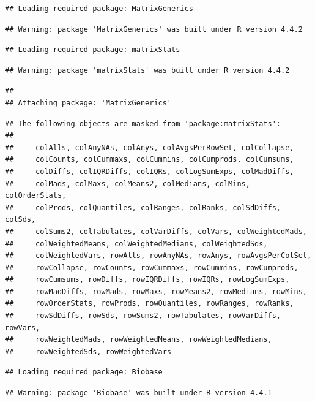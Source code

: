 \documentclass[
]{article}
\begin{document}
\begin{verbatim}
## Loading required package: MatrixGenerics
\end{verbatim}

\begin{verbatim}
## Warning: package 'MatrixGenerics' was built under R version 4.4.2
\end{verbatim}

\begin{verbatim}
## Loading required package: matrixStats
\end{verbatim}

\begin{verbatim}
## Warning: package 'matrixStats' was built under R version 4.4.2
\end{verbatim}

\begin{verbatim}
## 
## Attaching package: 'MatrixGenerics'
\end{verbatim}

\begin{verbatim}
## The following objects are masked from 'package:matrixStats':
## 
##     colAlls, colAnyNAs, colAnys, colAvgsPerRowSet, colCollapse,
##     colCounts, colCummaxs, colCummins, colCumprods, colCumsums,
##     colDiffs, colIQRDiffs, colIQRs, colLogSumExps, colMadDiffs,
##     colMads, colMaxs, colMeans2, colMedians, colMins, colOrderStats,
##     colProds, colQuantiles, colRanges, colRanks, colSdDiffs, colSds,
##     colSums2, colTabulates, colVarDiffs, colVars, colWeightedMads,
##     colWeightedMeans, colWeightedMedians, colWeightedSds,
##     colWeightedVars, rowAlls, rowAnyNAs, rowAnys, rowAvgsPerColSet,
##     rowCollapse, rowCounts, rowCummaxs, rowCummins, rowCumprods,
##     rowCumsums, rowDiffs, rowIQRDiffs, rowIQRs, rowLogSumExps,
##     rowMadDiffs, rowMads, rowMaxs, rowMeans2, rowMedians, rowMins,
##     rowOrderStats, rowProds, rowQuantiles, rowRanges, rowRanks,
##     rowSdDiffs, rowSds, rowSums2, rowTabulates, rowVarDiffs, rowVars,
##     rowWeightedMads, rowWeightedMeans, rowWeightedMedians,
##     rowWeightedSds, rowWeightedVars
\end{verbatim}

\begin{verbatim}
## Loading required package: Biobase
\end{verbatim}

\begin{verbatim}
## Warning: package 'Biobase' was built under R version 4.4.1
\end{verbatim}
\end{document}
